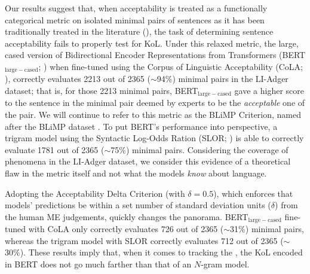 Our results suggest that, when acceptability is treated as a functionally categorical metric on isolated minimal pairs of sentences as it has been traditionally treated in the literature (\DIFdelbegin {}\DIFdelend \DIFaddbegin {}\DIFaddend ), the task of determining sentence acceptability fails to properly test for KoL.  Under this relaxed metric, the large, cased version of Bidirectional Encoder Representations from Transformers (BERT$_{\mathrm{large-cased}}$; \DIFdelbegin {}\DIFdelend \DIFaddbegin {}\DIFaddend ) when fine-tuned using the Corpus of Linguistic Acceptability (CoLA; \DIFdelbegin {}\DIFdelend \DIFaddbegin {}\DIFaddend ), correctly evaluates 2213 out of 2365 ($\sim$94\%) minimal pairs in the LI-Adger dataset; that is, for those 2213 minimal pairs, BERT$_{\mathrm{large-cased}}$ gave a higher score to the sentence in the minimal pair deemed by experts to be the \textit{acceptable} one of the pair.  We will continue to refer to this metric as the BLiMP Criterion, named after the BLiMP dataset \DIFdelbegin {}\DIFdelend \DIFaddbegin {}\DIFaddend .  To put BERT's performance into perspective, a trigram model using the Syntactic Log-Odds Ration (SLOR; \DIFdelbegin {}\DIFdelend \DIFaddbegin {}\DIFaddend ) is able to correctly evaluate 1781 out of 2365 ($\sim$75\%) minimal pairs.  Considering the coverage of phenomena in the LI-Adger dataset,%
we consider this evidence of a theoretical flaw in the metric itself and not what the models \textit{know} about language.
\DIFaddbegin 

\DIFaddend Adopting the Acceptability Delta Criterion (with $\delta=0.5$), which enforces that models' predictions be within a set number of standard deviation units ($\delta$) from the human ME judgements, quickly changes the panorama.  BERT$_{\mathrm{large-cased}}$ fine-tuned with CoLA only correctly evaluates 726 out of 2365 ($\sim$31\%) minimal pairs, whereas the trigram model with SLOR correctly evaluates 712 out of 2365 ($\sim$30\%).  These results imply that, when it comes to tracking the \DIFaddend , the KoL encoded in BERT does not go much farther than that of an $N$-gram model.


